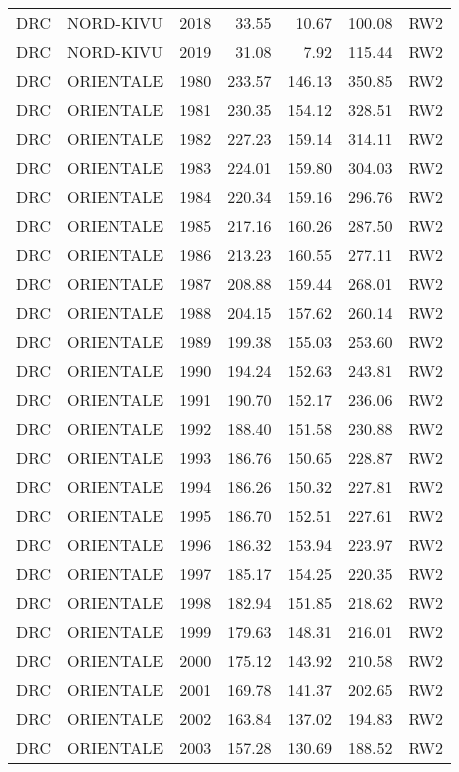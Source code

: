 \begin{longtable}{lllrrrl}
  DRC & NORD-KIVU & 2018 & 33.55 & 10.67 & 100.08 & RW2 \\ 
  DRC & NORD-KIVU & 2019 & 31.08 & 7.92 & 115.44 & RW2 \\ 
  DRC & ORIENTALE & 1980 & 233.57 & 146.13 & 350.85 & RW2 \\ 
  DRC & ORIENTALE & 1981 & 230.35 & 154.12 & 328.51 & RW2 \\ 
  DRC & ORIENTALE & 1982 & 227.23 & 159.14 & 314.11 & RW2 \\ 
  DRC & ORIENTALE & 1983 & 224.01 & 159.80 & 304.03 & RW2 \\ 
  DRC & ORIENTALE & 1984 & 220.34 & 159.16 & 296.76 & RW2 \\ 
  DRC & ORIENTALE & 1985 & 217.16 & 160.26 & 287.50 & RW2 \\ 
  DRC & ORIENTALE & 1986 & 213.23 & 160.55 & 277.11 & RW2 \\ 
  DRC & ORIENTALE & 1987 & 208.88 & 159.44 & 268.01 & RW2 \\ 
  DRC & ORIENTALE & 1988 & 204.15 & 157.62 & 260.14 & RW2 \\ 
  DRC & ORIENTALE & 1989 & 199.38 & 155.03 & 253.60 & RW2 \\ 
  DRC & ORIENTALE & 1990 & 194.24 & 152.63 & 243.81 & RW2 \\ 
  DRC & ORIENTALE & 1991 & 190.70 & 152.17 & 236.06 & RW2 \\ 
  DRC & ORIENTALE & 1992 & 188.40 & 151.58 & 230.88 & RW2 \\ 
  DRC & ORIENTALE & 1993 & 186.76 & 150.65 & 228.87 & RW2 \\ 
  DRC & ORIENTALE & 1994 & 186.26 & 150.32 & 227.81 & RW2 \\ 
  DRC & ORIENTALE & 1995 & 186.70 & 152.51 & 227.61 & RW2 \\ 
  DRC & ORIENTALE & 1996 & 186.32 & 153.94 & 223.97 & RW2 \\ 
  DRC & ORIENTALE & 1997 & 185.17 & 154.25 & 220.35 & RW2 \\ 
  DRC & ORIENTALE & 1998 & 182.94 & 151.85 & 218.62 & RW2 \\ 
  DRC & ORIENTALE & 1999 & 179.63 & 148.31 & 216.01 & RW2 \\ 
  DRC & ORIENTALE & 2000 & 175.12 & 143.92 & 210.58 & RW2 \\ 
  DRC & ORIENTALE & 2001 & 169.78 & 141.37 & 202.65 & RW2 \\ 
  DRC & ORIENTALE & 2002 & 163.84 & 137.02 & 194.83 & RW2 \\ 
  DRC & ORIENTALE & 2003 & 157.28 & 130.69 & 188.52 & RW2 \\ 

\end{longtable}
